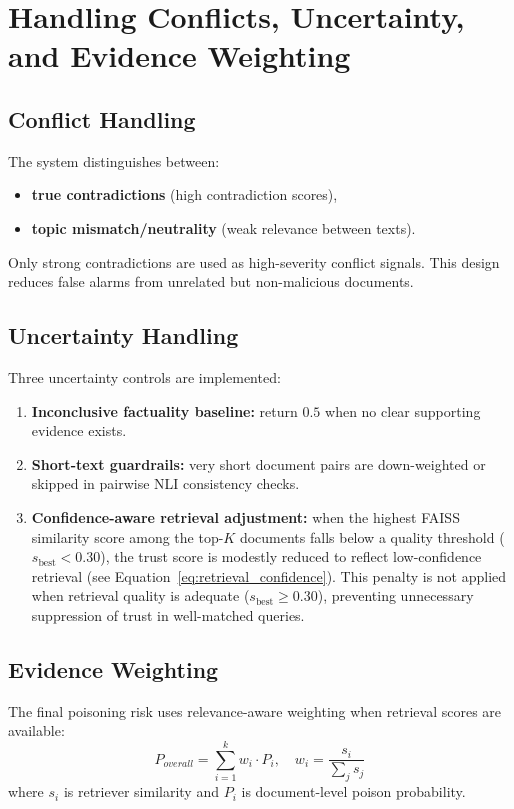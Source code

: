 \section{Handling Conflicts, Uncertainty, and Evidence Weighting}

\subsection{Conflict Handling}
The system distinguishes between:
\begin{itemize}
    \item \textbf{true contradictions} (high contradiction scores),
    \item \textbf{topic mismatch/neutrality} (weak relevance between texts).
\end{itemize}
Only strong contradictions are used as high-severity conflict signals. This design reduces false alarms from unrelated but non-malicious documents.

\subsection{Uncertainty Handling}
Three uncertainty controls are implemented:
\begin{enumerate}
    \item \textbf{Inconclusive factuality baseline:} return $0.5$ when no clear supporting evidence exists.
    \item \textbf{Short-text guardrails:} very short document pairs are down-weighted or skipped in pairwise NLI consistency checks.
    \item \textbf{Confidence-aware retrieval adjustment:} when the highest FAISS similarity score among the top-$K$ documents falls below a quality threshold ($s_{\text{best}} < 0.30$), the trust score is modestly reduced to reflect low-confidence retrieval (see Equation~\ref{eq:retrieval_confidence}). This penalty is not applied when retrieval quality is adequate ($s_{\text{best}} \geq 0.30$), preventing unnecessary suppression of trust in well-matched queries.
\end{enumerate}

\subsection{Evidence Weighting}
The final poisoning risk uses relevance-aware weighting when retrieval scores are available:
\begin{equation}
P_{overall} = \sum_{i=1}^{k} w_i \cdot P_i, \quad w_i = \frac{s_i}{\sum_j s_j}
\end{equation}
where $s_i$ is retriever similarity and $P_i$ is document-level poison probability.

